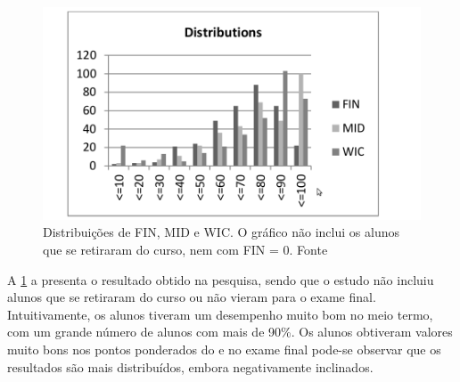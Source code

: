 \begin{figure}[h]
	\centering
	\captionsetup{justification=centering}
	\includegraphics[width=.8\linewidth]{imagens/cukierman.png}
	\caption{Distribuições de FIN, MID e WIC. O gráfico não inclui os alunos que se retiraram do curso, nem com FIN = 0. Fonte \cite{Cukierman:2015:PSU:2729094.2742623}}
	\label{figura:resultadoCukierman}
\end{figure}

A \cref{figura:resultadoCukierman} a presenta o resultado obtido na pesquisa, sendo que o estudo não incluiu alunos que se retiraram do curso ou não vieram para o exame final. Intuitivamente, os alunos tiveram um desempenho muito bom no meio termo, com um grande número de alunos com mais de 90\%. Os alunos obtiveram valores muito bons nos pontos ponderados do  e no exame final pode-se observar que os resultados são mais distribuídos, embora negativamente inclinados.

